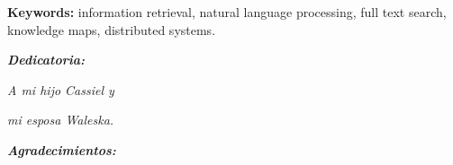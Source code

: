 \documentclass[
  10,
  openany]{book}
\begin{document}
\textbf{Keywords:} information retrieval, natural language processing, full text search, knowledge maps, distributed systems.


\thispagestyle{empty}




\setlength{\abovedisplayskip}{-5pt}
\setlength{\abovedisplayshortskip}{-5pt}
\thispagestyle{empty}

\newpage
\begin{center}
\large{\textbf{\emph{\Huge{Dedicatoria:}}}}
\end{center}
\thispagestyle{empty}
\vspace*{5cm}
\thispagestyle{empty}
\begin{center} \Large \emph{A  mi hijo Cassiel y  } \end{center}
\vspace*{1cm}
\begin{center} \Large \emph{mi esposa Waleska.} \end{center}



\newpage
\begin{center}
\large{\textbf{\emph{\Huge{Agradecimientos:}}}}
\end{center}
\thispagestyle{empty}
\vspace*{2cm}
\thispagestyle{empty}
\end{document}
